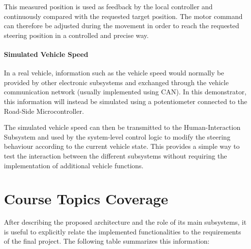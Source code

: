 This measured position is used as feedback by the local controller and continuously compared with the requested target position. The motor command can therefore be adjusted during the movement in order to reach the requested steering position in a controlled and precise way.

\paragraph{Simulated Vehicle Speed}
In a real vehicle, information such as the vehicle speed would normally be provided by other electronic subsystems and exchanged through the vehicle communication network (usually implemented using CAN). In this demonstrator, this information will instead be simulated using a potentiometer connected to the Road-Side Microcontroller.

The simulated vehicle speed can then be transmitted to the Human-Interaction Subsystem and used by the system-level control logic to modify the steering behaviour according to the current vehicle state. This provides a simple way to test the interaction between the different subsystems without requiring the implementation of additional vehicle functions.





\section{Course Topics Coverage}

After describing the proposed architecture and the role of its main subsystems, it is useful to explicitly relate the implemented functionalities to the requirements of the final project. The following table summarizes this information:

